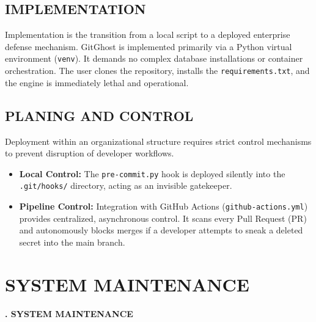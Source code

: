 \documentclass[12pt, a4paper, oneside]{report}
\begin{document}
\section{IMPLEMENTATION}
Implementation is the transition from a local script to a deployed enterprise defense mechanism. GitGhost is implemented primarily via a Python virtual environment (\texttt{venv}). It demands no complex database installations or container orchestration. The user clones the repository, installs the \texttt{requirements.txt}, and the engine is immediately lethal and operational.

\section{PLANING AND CONTROL}
Deployment within an organizational structure requires strict control mechanisms to prevent disruption of developer workflows. 
\begin{itemize}
    \item \textbf{Local Control:} The \texttt{pre-commit.py} hook is deployed silently into the \texttt{.git/hooks/} directory, acting as an invisible gatekeeper.
    \item \textbf{Pipeline Control:} Integration with GitHub Actions (\texttt{github-actions.yml}) provides centralized, asynchronous control. It scans every Pull Request (PR) and autonomously blocks merges if a developer attempts to sneak a deleted secret into the main branch.
\end{itemize}

\chapter{SYSTEM MAINTENANCE}
\begin{center}
    {\Large \textbf{\thechapter. SYSTEM MAINTENANCE} \par}
\end{center}
\vspace{1cm}
\end{document}
